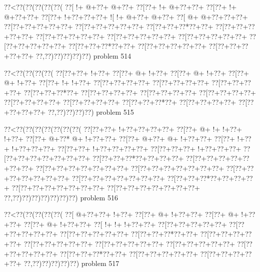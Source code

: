 \vbox{\vbox{\goo
\0??<\0??(\0??(\0??(\0??(\0??(
\0??[\- !+\- @+\0??+\- @+\0??+
\0??[\0??+\- !+\- @+\0??+\0??+
\0??[\0??+\- !+\- @+\0??+\0??+
\0??[\0??+\- !+\0??+\0??+\0??+
\- ![\- !+\- @+\0??+\- @+\0??+
\0??[\- @+\- @+\0??+\0??+\0??+
\0??[\0??+\0??+\0??+\0??+\0??+
\0??[\0??+\0??+\0??+\0??+\0??+
\0??[\0??+\0??+\0??*\0??+\0??+
\0??[\0??+\0??+\0??+\0??+\0??+
\0??[\0??+\0??+\0??+\0??+\0??+
\0??[\0??+\0??+\0??+\0??+\0??+
\0??[\0??+\0??+\0??+\0??+\0??+
\0??[\0??+\0??+\0??+\0??+\0??+
\0??[\0??+\0??+\0??*\0??+\0??+
\0??[\0??+\0??+\0??+\0??+\0??+
\0??[\0??+\0??+\0??+\0??+\0??+
\0??,\0??)\0??)\0??)\0??)\0??)
}
\hfil problem 514\hfil\break
}

\vbox{\vbox{\goo
\0??<\0??(\0??(\0??(\0??(
\0??[\0??+\0??+\- !+\0??+
\0??[\0??+\- @+\- !+\0??+
\0??[\0??+\- @+\- !+\0??+
\0??[\0??+\- @+\- !+\0??+
\0??[\0??+\- !+\- !+\0??+
\0??[\0??+\0??+\0??+\0??+
\0??[\0??+\0??+\0??+\0??+
\0??[\0??+\0??+\0??+\0??+
\0??[\0??+\0??+\0??*\0??+
\0??[\0??+\0??+\0??+\0??+
\0??[\0??+\0??+\0??+\0??+
\0??[\0??+\0??+\0??+\0??+
\0??[\0??+\0??+\0??+\0??+
\0??[\0??+\0??+\0??+\0??+
\0??[\0??+\0??+\0??*\0??+
\0??[\0??+\0??+\0??+\0??+
\0??[\0??+\0??+\0??+\0??+
\0??,\0??)\0??)\0??)\0??)
}
\hfil problem 515\hfil\break
}

\vbox{\vbox{\goo
\0??<\0??(\0??(\0??(\0??(\0??(\0??(\0??(
\0??[\0??+\0??+\- !+\0??+\0??+\0??+\0??+
\0??[\0??+\- @+\- !+\- !+\0??+\- !+\0??+
\0??[\0??+\- @+\0??*\- @+\- !+\0??+\0??+
\0??[\0??+\- @+\0??+\- @+\- !+\0??+\0??+
\0??[\0??+\- !+\0??+\- !+\0??+\0??+\0??+
\0??[\0??+\0??+\- !+\0??+\0??+\0??+\0??+
\0??[\0??+\0??+\0??+\- !+\0??+\0??+\0??+
\0??[\0??+\0??+\0??+\0??+\0??+\0??+\0??+
\0??[\0??+\0??+\0??*\0??+\0??+\0??+\0??+
\0??[\0??+\0??+\0??+\0??+\0??+\0??+\0??+
\0??[\0??+\0??+\0??+\0??+\0??+\0??+\0??+
\0??[\0??+\0??+\0??+\0??+\0??+\0??+\0??+
\0??[\0??+\0??+\0??+\0??+\0??+\0??+\0??+
\0??[\0??+\0??+\0??+\0??+\0??+\0??+\0??+
\0??[\0??+\0??+\0??*\0??+\0??+\0??+\0??+
\0??[\0??+\0??+\0??+\0??+\0??+\0??+\0??+
\0??[\0??+\0??+\0??+\0??+\0??+\0??+\0??+
\0??,\0??)\0??)\0??)\0??)\0??)\0??)\0??)
}
\hfil problem 516\hfil\break
}

\vbox{\vbox{\goo
\0??<\0??(\0??(\0??(\0??(\0??(
\0??[\- @+\0??+\0??+\- !+\0??+
\0??[\0??+\- @+\- !+\0??+\0??+
\0??[\0??+\- @+\- !+\0??+\0??+
\0??[\0??+\- @+\- !+\0??+\0??+
\0??[\- !+\- !+\- !+\0??+\0??+
\0??[\0??+\0??+\0??+\0??+\0??+
\0??[\0??+\0??+\0??+\0??+\0??+
\0??[\0??+\0??+\0??+\0??+\0??+
\0??[\0??+\0??+\0??*\0??+\0??+
\0??[\0??+\0??+\0??+\0??+\0??+
\0??[\0??+\0??+\0??+\0??+\0??+
\0??[\0??+\0??+\0??+\0??+\0??+
\0??[\0??+\0??+\0??+\0??+\0??+
\0??[\0??+\0??+\0??+\0??+\0??+
\0??[\0??+\0??+\0??*\0??+\0??+
\0??[\0??+\0??+\0??+\0??+\0??+
\0??[\0??+\0??+\0??+\0??+\0??+
\0??,\0??)\0??)\0??)\0??)\0??)
}
\hfil problem 517\hfil\break
}

